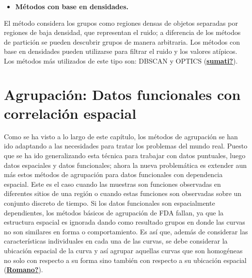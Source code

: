 \documentclass[
]{book}
\providecommand{\tightlist}{%
  \setlength{\itemsep}{0pt}\setlength{\parskip}{0pt}}
\begin{document}
\begin{itemize}
\tightlist
\item
  \textbf{Métodos con base en densidades.}
\end{itemize}

El método considera los grupos como regiones densas de objetos separadas por regiones de baja densidad, que representan el ruido; a diferencia de los métodos de partición se pueden descubrir grupos de manera arbitraria. Los métodos con base en densidades pueden utilizarse para filtrar el ruido y los valores atípicos. Los métodos más utilizados de este tipo son: DBSCAN y OPTICS (\protect\hyperlink{ref-sumati}{\textbf{sumati?}}).

\hypertarget{agrupaciuxf3n-datos-funcionales-con-correlaciuxf3n-espacial}{%
\section{Agrupación: Datos funcionales con correlación espacial}\label{agrupaciuxf3n-datos-funcionales-con-correlaciuxf3n-espacial}}

Como se ha visto a lo largo de este capítulo, los métodos de agrupación se han ido adaptando a las necesidades para tratar los problemas del mundo real. Puesto que se ha ido generalizando esta técnica para trabajar con datos puntuales, luego datos espaciales y datos funcionales; ahora la nueva problemática es extender aun más estos métodos de agrupación para datos funcionales con dependencia espacial. Este es el caso cuando las muestras son funciones observadas en diferentes sitios de una región o cuando estas funciones son observadas sobre un conjunto discreto de tiempo. Si los datos funcionales son espacialmente dependientes, los métodos básicos de agrupación de FDA fallan, ya que la estructura espacial es ignorada dando como resultado grupos en donde las curvas no son similares en forma o comportamiento. Es así que, además de considerar las características individuales en cada una de las curvas, se debe considerar la ubicación espacial de la curva y así agrupar aquellas curvas que son homogéneas no solo con respecto a su forma sino también con respecto a su ubicación espacial (\protect\hyperlink{ref-Romano}{\textbf{Romano?}}).
\end{document}
